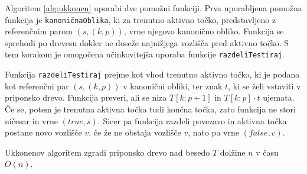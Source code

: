 Algoritem \ref{alg:ukkonen} uporabi dve pomožni funkciji. Prva uporabljena pomožna funkcija je \texttt{kanoničnaOblika}, ki za trenutno aktivno točko, predstavljeno z referenčnim parom $(s,(k, p))$, vrne njegovo kanonično obliko. Funkcija se sprehodi po drevesu dokler ne doseže najnižjega vozlišča pred aktivno točko. S tem korakom je omogočena učinkovitejša uporaba funkcije \texttt{razdeliTestiraj}.

Funkcija \texttt{razdeliTestiraj} prejme kot vhod trenutno aktivno točko, ki je podana kot referenčni par $(s,(k,p))$ v kanonični obliki, ter znak $t$, ki se želi vstaviti v priponsko drevo. Funkcija preveri, ali se niza $T[k:p+1]$ in $T[k:p]\cdot t$ ujemata. Če se, potem je trenutna aktivna točka tudi končna točka, zato funkcija ne stori ničesar in vrne $(\textit{true},s)$. Sicer pa funkcija razdeli povezavo in aktivna točka postane novo vozlišče $v$, če že ne obstaja vozlišče $v$, nato pa vrne $(\textit{false},v)$. 


\begin{izr} \label{izr:ukkonen}
    Ukkonenov algoritem zgradi priponsko drevo nad besedo $T$ dolžine $n$ v času $O(n)$.
\end{izr}


